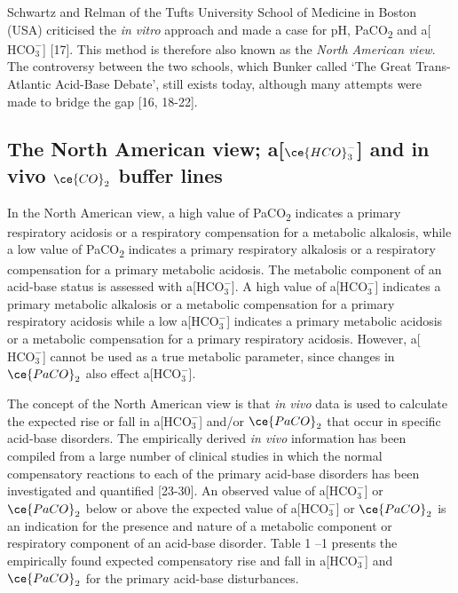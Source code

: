 \documentclass[
  12pt,
  a4paperpaper,
]{report}
\begin{document}
Schwartz and Relman of the Tufts University School of Medicine in Boston
(USA) criticised the \emph{in vitro} approach and made a case for pH,
Pa\textsc{CO}\textsubscript{2} and a{[}\(\text{HCO}_{3}^{-}\){]}
{[}17{]}. This method is therefore also known as the \emph{North
American view}. The controversy between the two schools, which Bunker
called `The Great Trans-Atlantic Acid-Base Debate', still exists today,
although many attempts were made to bridge the gap {[}16, 18-22{]}.

\hypertarget{the-north-american-view-acehco_3--and-in-vivo-ceco_2-buffer-lines}{%
\subsection{\texorpdfstring{The North American view;
a{[}\(\ce{HCO}_{3}^{-}\){]} and in vivo \(\ce{CO}_{2}\) buffer
lines}{The North American view; a{[}\textbackslash ce\{HCO\}\_\{3\}\^{}\{-\}{]} and in vivo \textbackslash ce\{CO\}\_\{2\} buffer lines}}\label{the-north-american-view-acehco_3--and-in-vivo-ceco_2-buffer-lines}}

In the North American view, a high value of
Pa\textsc{CO}\textsubscript{2} indicates a primary respiratory acidosis
or a respiratory compensation for a metabolic alkalosis, while a low
value of Pa\textsc{CO}\textsubscript{2} indicates a primary respiratory
alkalosis or a respiratory compensation for a primary metabolic
acidosis. The metabolic component of an acid-base status is assessed
with a{[}\(\text{HCO}_{3}^{-}\){]}. A high value of
a{[}\(\text{HCO}_{3}^{-}\){]} indicates a primary metabolic alkalosis or
a metabolic compensation for a primary respiratory acidosis while a low
a{[}\(\text{HCO}_{3}^{-}\){]} indicates a primary metabolic acidosis or
a metabolic compensation for a primary respiratory acidosis. However,
a{[}\(\text{HCO}_{3}^{-}\){]} cannot be used as a true metabolic
parameter, since changes in \(\ce{PaCO}_{2}\) also effect
a{[}\(\text{HCO}_{3}^{-}\){]}.

The concept of the North American view is that \emph{in vivo} data is
used to calculate the expected rise or fall in
a{[}\(\text{HCO}_{3}^{-}\){]} and/or \(\ce{PaCO}_{2}\) that occur in
specific acid-base disorders. The empirically derived \emph{in vivo}
information has been compiled from a large number of clinical studies in
which the normal compensatory reactions to each of the primary acid-base
disorders has been investigated and quantified {[}23-30{]}. An observed
value of a{[}\(\text{HCO}_{3}^{-}\){]} or \(\ce{PaCO}_{2}\) below or
above the expected value of a{[}\(\text{HCO}_{3}^{-}\){]} or
\(\ce{PaCO}_{2}\) is an indication for the presence and nature of a
metabolic component or respiratory component of an acid-base disorder.
Table 1 --1 presents the empirically found expected compensatory rise
and fall in a{[}\(\text{HCO}_{3}^{-}\){]} and \(\ce{PaCO}_{2}\) for the
primary acid-base disturbances.
\end{document}
